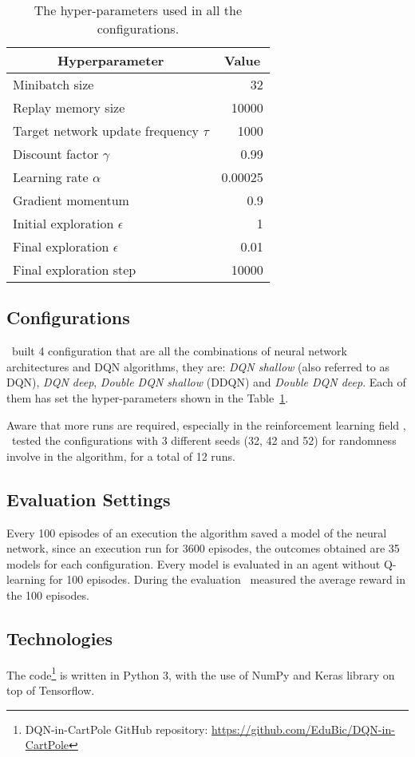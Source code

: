 \begin{table}
	\centering
	\begin{tabular}{|l|r|}
		\hline
		\multicolumn{1}{|c|}{\textbf{Hyperparameter}} &
		\multicolumn{1}{|c|}{\textbf{Value}}        \\
		\hline
		Minibatch size & 32 \\
		Replay memory size & 10000 \\
		Target network update frequency $\tau$ & 1000 \\
		Discount factor $\gamma$ & 0.99 \\
		Learning rate $\alpha$ & 0.00025 \\
		Gradient momentum & 0.9 \\
		Initial exploration $\epsilon$ & 1 \\
		Final exploration $\epsilon$ & 0.01 \\
		Final exploration step & 10000 \\
		\hline
	\end{tabular}
	
	\caption{The hyper-parameters used in all the configurations.}
	\label{tab:my-hyperparams}
\end{table}

\subsection{Configurations}

\Auth~built 4 configuration that are all the combinations of neural network architectures and DQN algorithms, they are: \textit{DQN shallow} (also referred to as DQN), \textit{DQN deep}, \textit{Double DQN shallow} (DDQN) and \textit{Double DQN deep}. Each of them has set the hyper-parameters shown in the Table~\ref{tab:my-hyperparams}.

Aware that more runs are required, especially in the reinforcement learning field \cite{DBLP:journals/corr/abs-1709-06560}, \auth~tested the configurations with 3 different seeds (32, 42 and 52) for randomness involve in the algorithm, for a total of 12 runs.


\subsection{Evaluation Settings}

Every 100 episodes of an execution the algorithm saved a model of the neural network, since an execution run for 3600 episodes, the outcomes obtained are 35 models for each configuration. Every model is evaluated in an agent without Q-learning for 100 episodes. During the evaluation \auth~measured the average reward in the 100 episodes.

\subsection{Technologies}
The code\footnote{DQN-in-CartPole GitHub repository: \url{https://github.com/EduBic/DQN-in-CartPole}} is written in Python 3, with the use of NumPy and Keras library on top of Tensorflow.





